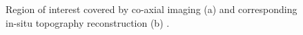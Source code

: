 \begin{figure}
    \centering
    \qquad
    \caption[Co-axial sensing result.]{Region of interest covered by co-axial imaging (a) and corresponding in-situ topography reconstruction (b) \cite{neef_low_2014}.}
\end{figure}
